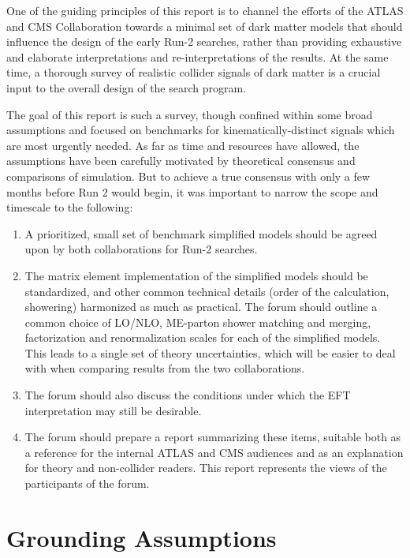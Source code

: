 One of the guiding principles of this report is to channel the efforts
of the ATLAS and CMS Collaboration towards a minimal set of dark
matter models that should influence the design of the early Run-2
searches, rather than providing exhaustive and elaborate
interpretations and re-interpretations of the results. At the same
time, a thorough survey of realistic collider signals of dark matter
is a crucial input to the overall design of the search program.

The goal of this report is such a survey, though confined within some
broad assumptions and focused on benchmarks for kinematically-distinct
signals which are most urgently needed. As far as time and resources
have allowed, the assumptions have been carefully motivated by
theoretical consensus and comparisons of simulation. But to achieve a
true consensus with only a few months before Run 2 would begin, it was
important to narrow the scope and timescale to the following:

\begin{enumerate}
\item A prioritized, small set of benchmark simplified models should
  be agreed upon by both collaborations for Run-2 searches.
\item The matrix element implementation of the simplified models
  should be standardized, and other common technical details (order of
  the calculation, showering) harmonized as much as practical. The forum should 
  outline a common choice of LO/NLO, ME-parton
  shower matching and merging, factorization and renormalization
  scales for each of the simplified models. This leads to a
  single set of theory uncertainties, which will be easier to deal
  with when comparing results from the two collaborations.
\item The forum should also discuss the conditions under which the EFT
  interpretation may still be desirable.
\item The forum should prepare a report summarizing these items,
  suitable both as a reference for the internal ATLAS and CMS
  audiences and as an explanation for theory and non-collider
  readers. This report represents the views of the participants of the
  forum.
\end{enumerate}

\section{Grounding Assumptions}

